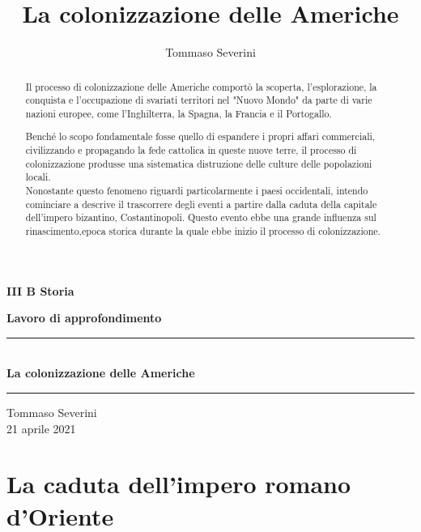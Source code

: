 \documentclass[11pt]{report}
\title{La colonizzazione delle Americhe}
\author{Tommaso Severini}
\begin{document}
	
	
	\begin{titlepage}
		\begin{center}
			\Large\textbf{ III B Storia}
			
			\Large\textbf{Lavoro di approfondimento}
			\vfill
			\rule{400pt}{0.1pt}\\
			
			\huge\textbf{La colonizzazione delle Americhe}
			\rule{400pt}{0.1pt}
			\vfill
			{\small Tommaso Severini\\
			21 aprile 2021}
		\end{center}
	\end{titlepage}	
	
	\begin{abstract}
		Il processo di colonizzazione delle Americhe comportò la scoperta, l'esplorazione, la conquista e l'occupazione di svariati territori nel "Nuovo Mondo" da parte di varie nazioni europee, come l'Inghilterra, la Spagna, la Francia e il Portogallo. 
		
		Benché lo scopo fondamentale fosse quello di espandere i propri affari commerciali, civilizzando e propagando la fede cattolica in queste nuove terre, il processo di colonizzazione produsse una sistematica distruzione delle culture delle popolazioni locali.\\
		
		Nonostante questo fenomeno riguardi particolarmente i paesi occidentali, intendo cominciare a descrive il trascorrere degli eventi a partire dalla caduta della capitale dell'impero bizantino, Costantinopoli. Questo evento ebbe una grande influenza sul rinascimento,epoca storica durante la quale ebbe inizio il processo di colonizzazione.
	\end{abstract}
	
	\chapter{La caduta dell'impero romano d'Oriente}
	
	
	
\end{document}
